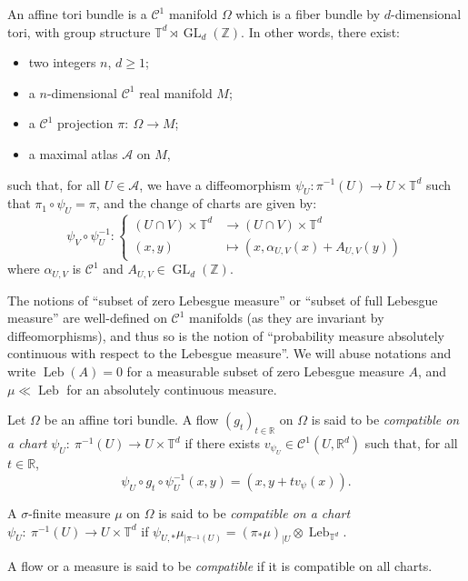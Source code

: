 \documentclass[AHL,Unicode,longabstracts]{cedram}
\DeclareMathOperator{\GL}{GL}
\DeclareMathOperator{\Leb}{Leb}
\newcommand{\Z}{\mathbb{Z}}
\newcommand{\R}{\mathbb{R}}
\newcommand{\Tbb}{\mathbb{T}}
\newcommand{\Acal}{\mathcal{A}}
\newcommand{\Ccal}{\mathcal{C}}
\begin{document}
\begin{defi}%
An affine tori bundle is a $\Ccal^1$ manifold $\Omega$ which is a fiber bundle by $d$-dimensional tori, with group structure $\Tbb^d \rtimes \GL_d (\Z)$. In other words, there exist:
\begin{itemize}
\item two integers $n$, $d \geq 1$;
\item a $n$-dimensional $\Ccal^1$ real manifold $M$;
\item a $\Ccal^1$ projection $\pi : \ \Omega \to M$;
\item a maximal atlas $\Acal$ on $M$,
\end{itemize}
such that, for all $U \in \Acal$, we have a diffeomorphism $\psi_U : \pi^{-1} (U) \to U \times \Tbb^d$ such that $\pi_1 \circ \psi_U = \pi$, and the change of charts are given by:
\[
\psi_V \circ \psi_U^{-1} : 
\begin{cases}
(U \cap V) \times \Tbb^d & \to (U \cap V) \times \Tbb^d \\
(x,y) & \mapsto (x, \alpha_{U, V} (x) + A_{U, V} (y))
\end{cases}
\]
where $\alpha_{U,V}$ is $\Ccal^1$ and $A_{U, V} \in \GL_d (\Z)$.
\end{defi}


The notions of ``subset of zero Lebesgue measure'' or ``subset of full Lebesgue measure'' are well-defined on $\Ccal^1$ manifolds (as they are invariant by diffeomorphisms), and thus so is the notion of ``probability measure absolutely continuous with respect to the Lebesgue measure''. We will abuse notations and write $\Leb (A) = 0$ for a measurable subset of zero Lebesgue measure $A$, and $\mu \ll \Leb$ for an absolutely continuous measure.


\begin{defi}%
Let $\Omega$ be an affine tori bundle. A flow $(g_t)_{t \in \R}$ on $\Omega$ is said to be \emph{compatible on a chart} $\psi_U : \ \pi^{-1} (U) \to U \times \Tbb^d$ if there exists $v_{\psi_U} \in \Ccal^1 (U, \R^d)$ such that, for all $t \in \R$,
\[
\psi_U \circ g_t \circ \psi_U^{-1} (x,y) = (x, y + t v_\psi (x)).
\]

A $\sigma$-finite measure $\mu$ on $\Omega$ is said to be \emph{compatible on a chart} $\psi_U : \ \pi^{-1} (U) \to U \times \Tbb^d$ if $\psi_{U,*} \mu_{|\pi^{-1} (U)} = (\pi_* \mu)_{|U} \otimes \Leb_{\Tbb^d}$.


A flow or a measure is said to be \emph{compatible} if it is compatible on all charts.
\end{defi}
\end{document}
